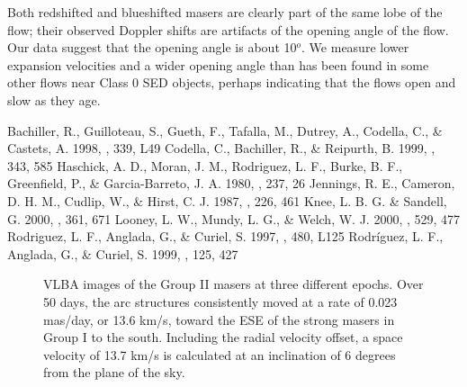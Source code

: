 	Both redshifted and blueshifted masers are clearly part of the same lobe of the flow; their observed Doppler shifts are artifacts of the opening angle of the flow.  Our data suggest that the opening angle is about 10$^o$.  We measure lower expansion velocities and a wider opening angle than has been found in some other flows near Class 0 SED objects, perhaps indicating that the flows open and slow as they age.

\begin{references}
 Bachiller, R., 
Guilloteau, S., Gueth, F., Tafalla, M., Dutrey, A., Codella, C., \& 
Castets, A. 1998, \aap, 339, L49 
 Codella, C., Bachiller, R., \& Reipurth, B. 1999, \aap, 343, 585 
 Haschick, A. D., 
Moran, J. M., Rodriguez, L. F., Burke, B. F., Greenfield, P., \& 
Garcia-Barreto, J. A. 1980, \apj, 237, 26 
Jennings, R. E., Cameron, D. H. M., Cudlip, W., \& Hirst, C. J. 1987, 
\mnras, 226, 461 
  Knee, L. B. G. \& 
Sandell, G. 2000, \aap, 361, 671 
  Looney, L. 
W., Mundy, L. G., \& Welch, W. J. 2000, \apj, 529, 477 
 Rodriguez, L. F., Anglada, G., \& Curiel, S. 1997, \apjl, 480, L125
Rodr{\'i}guez, L. F., Anglada, G., \& Curiel, S. 1999, \apjs, 125, 427 
\end{references}

\begin{figure}

\vspace{1.0in}
\caption{VLBA images of the Group II masers at three different epochs.  Over 50 days, the arc structures consistently  moved at a rate of  0.023 mas/day, or 13.6 km/s, toward the ESE of the strong masers in Group I to the south.
Including the radial velocity offset, a space velocity of 13.7 km/s is calculated at an inclination of 6 degrees from the plane of the sky.}

\end{figure}


